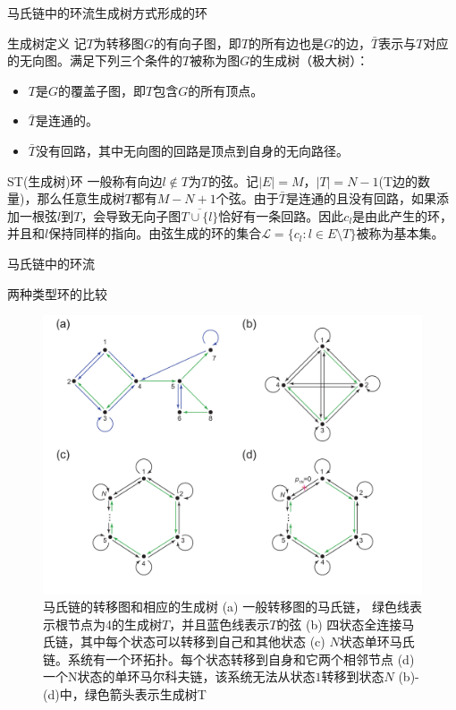 \documentclass{beamer}
\begin{document}
\begin{frame}{马氏链中的环流}{生成树方式形成的环}
	\begin{block}{生成树定义}
		记$T$为转移图$G$的有向子图，即$T$的所有边也是$G$的边，$\bar{T}$表示与$T$对应的无向图。满足下列三个条件的$T$被称为图$G$的生成树（极大树）：
		\begin{itemize}
			\item $T$是$G$的覆盖子图，即$T$包含$G$的所有顶点。
			\item $\bar{T}$是连通的。
			\item $\bar{T}$没有回路，其中无向图的回路是顶点到自身的无向路径。
		\end{itemize}
	\end{block}
	\begin{block}{ST(生成树)环}
		一般称有向边$l \notin T$为$T$的弦。记$|E|=M$，$|T|= N-1$(T边的数量)，那么任意生成树$T$都有$M-N+1$个弦。由于$\bar{T}$是连通的且没有回路，如果添加一根弦$l$到$T$，会导致无向子图$\overline{T \cup \{l\}}$恰好有一条回路。因此$c_l$是由此产生的环，并且和$l$保持同样的指向。由弦生成的环的集合$\mathcal{L} = \{c_l: l\in E\setminus T\}$被称为基本集。
	\end{block}
\end{frame}

\begin{frame}{马氏链中的环流}
	\begin{block}{两种类型环的比较}
		\begin{figure}[h]
			\centering
			\includegraphics[scale=0.3]{chart/transitiongraph.pdf}
			\caption{{\tiny 马氏链的转移图和相应的生成树 (a) 一般转移图的马氏链， 绿色线表示根节点为4的生成树$T$，并且蓝色线表示$T$的弦 (b) 四状态全连接马氏链，其中每个状态可以转移到自己和其他状态 (c) $N$状态单环马氏链。系统有一个环拓扑。每个状态转移到自身和它两个相邻节点 (d) 一个N状态的单环马尔科夫链，该系统无法从状态$1$转移到状态$N$ (b)-(d)中，绿色箭头表示生成树T}}
			\label{figure:transitiongraph}
		\end{figure}
	\end{block}
\end{frame}
\end{document}
